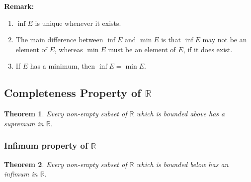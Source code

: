 \documentclass[8pt]{article}
\newtheorem{theorem}{Theorem}[section]
\theoremstyle{definition}
\begin{document}
\textbf{Remark:}
\begin{enumerate}[label=(\roman*)]
\item $\inf E$ is unique whenever it exists.
\item The main difference between $\inf E$ and $\min E$ is that $\inf E$ may not be an element of $E$, whereas $\min E$ must be an element of $E$, if it does exist.
\item If $E$ has a minimum, then $\inf E = \min E$.
\end{enumerate}
\subsection{Completeness Property of $\mathbb{R}$}
\begin{theorem}\normalfont Every non-empty subset of $\mathbb{R}$ which is bounded above has a supremum in $\mathbb{R}$.
\end{theorem}
\subsubsection{Infimum property of $\mathbb{R}$}
\begin{theorem}\normalfont Every non-empty subset of $\mathbb{R}$ which is bounded below has an infimum in $\mathbb{R}$.
\end{theorem}
\end{document}

